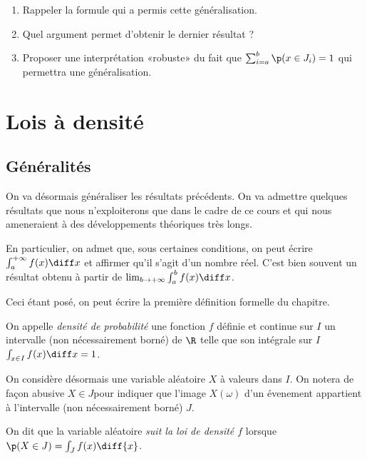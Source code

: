 \documentclass[11pt,a4paper,french]{article}
\begin{document}
\begin{exercice}
  \begin{enumerate}
    \item Rappeler la formule qui a permis cette généralisation.
    \item Quel argument permet d'obtenir le dernier résultat ?
    \item Proposer une interprétation «robuste» du fait que $\sum_{i =
      a}^b \p(x\in J_i) = 1$ qui permettra une généralisation.
  \end{enumerate}
\end{exercice}

\section{Lois à densité}

\subsection{Généralités}

On va désormais généraliser les résultats précédents. On va admettre
quelques résultats que nous n'exploiterons que dans le cadre de ce cours
et qui nous ameneraient à des développements théoriques très longs.

En particulier, on admet que, sous certaines conditions, on peut écrire
$\int_a^{+\infty}f(x)\diff x$ et affirmer qu'il s'agit d'un nombre réel.
C'est bien souvent un résultat obtenu à partir de
$\lim_{b\to+\infty}\int_a^b f(x) \diff x$.

Ceci étant posé, on peut écrire la première définition formelle du
chapitre.

\begin{definition}
  On appelle \emph{densité de probabilité} une fonction $f$ définie et
  continue sur $I$ un intervalle (non nécessairement borné) de $\R$
  telle que son intégrale sur $I$ $\int_{x\in I}f(x) \diff x = 1$.
\end{definition}

On considère désormais une variable aléatoire $X$ à valeurs dans $I$. On
notera de façon abusive $X \in J$pour indiquer que l'image $X(\omega)$
d'un évenement appartient à l'intervalle (non nécessairement borné) $J$.

\begin{definition}
  On dit que la variable aléatoire \emph{suit la loi de densité $f$}
  lorsque $\p(X\in J) = \int_{J} f(x)\diff{x}$.
\end{definition}
\end{document}
